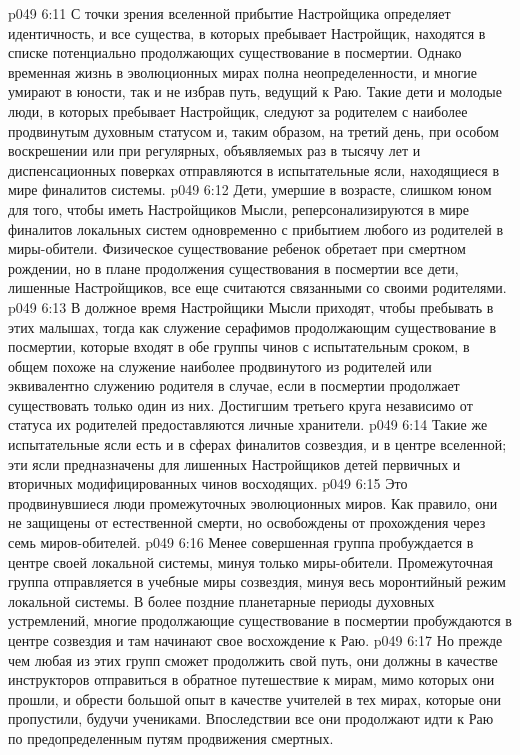 \vs p049 6:11 \bibnobreakspace {} С точки зрения вселенной прибытие Настройщика определяет идентичность, и все существа, в которых пребывает Настройщик, находятся в списке потенциально продолжающих существование в посмертии. Однако временная жизнь в эволюционных мирах полна неопределенности, и многие умирают в юности, так и не избрав путь, ведущий к Раю. Такие дети и молодые люди, в которых пребывает Настройщик, следуют за родителем с наиболее продвинутым духовным статусом и, таким образом, на третий день, при особом воскрешении или при регулярных, объявляемых раз в тысячу лет и диспенсационных поверках отправляются в испытательные ясли, находящиеся в мире финалитов системы.
\vs p049 6:12 Дети, умершие в возрасте, слишком юном для того, чтобы иметь Настройщиков Мысли, реперсонализируются в мире финалитов локальных систем одновременно с прибытием любого из родителей в миры\hyp{}обители. Физическое существование ребенок обретает при смертном рождении, но в плане продолжения существования в посмертии все дети, лишенные Настройщиков, все еще считаются связанными со своими родителями.
\vs p049 6:13 В должное время Настройщики Мысли приходят, чтобы пребывать в этих малышах, тогда как служение серафимов продолжающим существование в посмертии, которые входят в обе группы чинов с испытательным сроком, в общем похоже на служение наиболее продвинутого из родителей или эквивалентно служению родителя в случае, если в посмертии продолжает существовать только один из них. Достигшим третьего круга независимо от статуса их родителей предоставляются личные хранители.
\vs p049 6:14 Такие же испытательные ясли есть и в сферах финалитов созвездия, и в центре вселенной; эти ясли предназначены для лишенных Настройщиков детей первичных и вторичных модифицированных чинов восходящих.
\vs p049 6:15 \bibnobreakspace {} Это продвинувшиеся люди промежуточных эволюционных миров. Как правило, они не защищены от естественной смерти, но освобождены от прохождения через семь миров\hyp{}обителей.
\vs p049 6:16 Менее совершенная группа пробуждается в центре своей локальной системы, минуя только миры\hyp{}обители. Промежуточная группа отправляется в учебные миры созвездия, минуя весь моронтийный режим локальной системы. В более поздние планетарные периоды духовных устремлений, многие продолжающие существование в посмертии пробуждаются в центре созвездия и там начинают свое восхождение к Раю.
\vs p049 6:17 Но прежде чем любая из этих групп сможет продолжить свой путь, они должны в качестве инструкторов отправиться в обратное путешествие к мирам, мимо которых они прошли, и обрести большой опыт в качестве учителей в тех мирах, которые они пропустили, будучи учениками. Впоследствии все они продолжают идти к Раю по предопределенным путям продвижения смертных.
